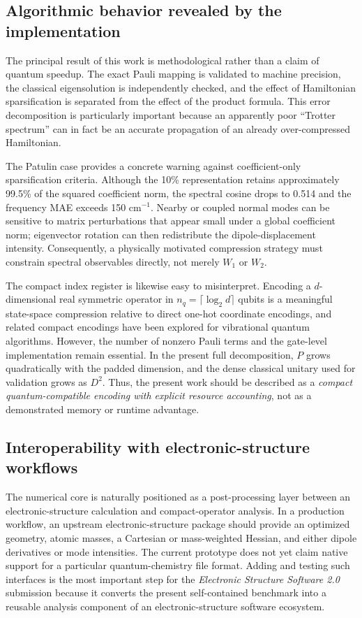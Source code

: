 \documentclass[aip,jcp,reprint,amsmath,amssymb,floatfix]{revtex4-2}
\begin{document}
\subsection{Algorithmic behavior revealed by the implementation}
The principal result of this work is methodological rather than a claim of quantum speedup. The exact Pauli mapping is validated to machine precision, the classical eigensolution is independently checked, and the effect of Hamiltonian sparsification is separated from the effect of the product formula. This error decomposition is particularly important because an apparently poor ``Trotter spectrum'' can in fact be an accurate propagation of an already over-compressed Hamiltonian.

The Patulin case provides a concrete warning against coefficient-only sparsification criteria. Although the 10\% representation retains approximately 99.5\% of the squared coefficient norm, the spectral cosine drops to 0.514 and the frequency MAE exceeds 150 cm$^{-1}$. Nearby or coupled normal modes can be sensitive to matrix perturbations that appear small under a global coefficient norm; eigenvector rotation can then redistribute the dipole-displacement intensity. Consequently, a physically motivated compression strategy must constrain spectral observables directly, not merely $W_1$ or $W_2$.

The compact index register is likewise easy to misinterpret. Encoding a $d$-dimensional real symmetric operator in $n_q=\lceil\log_2d\rceil$ qubits is a meaningful state-space compression relative to direct one-hot coordinate encodings, and related compact encodings have been explored for vibrational quantum algorithms.\cite{Sawaya2020dlevel,Sawaya2021} However, the number of nonzero Pauli terms and the gate-level implementation remain essential. In the present full decomposition, $P$ grows quadratically with the padded dimension, and the dense classical unitary used for validation grows as $D^2$. Thus, the present work should be described as a \emph{compact quantum-compatible encoding with explicit resource accounting}, not as a demonstrated memory or runtime advantage.

\subsection{Interoperability with electronic-structure workflows}
The numerical core is naturally positioned as a post-processing layer between an electronic-structure calculation and compact-operator analysis. In a production workflow, an upstream electronic-structure package should provide an optimized geometry, atomic masses, a Cartesian or mass-weighted Hessian, and either dipole derivatives or mode intensities. The current prototype does not yet claim native support for a particular quantum-chemistry file format. Adding and testing such interfaces is the most important step for the \emph{Electronic Structure Software 2.0} submission because it converts the present self-contained benchmark into a reusable analysis component of an electronic-structure software ecosystem.
\end{document}
